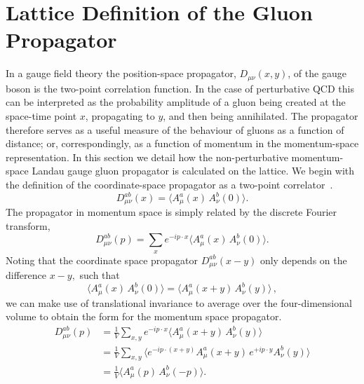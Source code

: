 \section{Lattice Definition of the Gluon Propagator}
In a gauge field theory the position-space propagator, $D_{\mu\nu}(x,y)$, of the gauge boson is the two-point correlation function. In the case of perturbative QCD this can be interpreted as the probability amplitude of a gluon being created at the space-time point $x$, propagating to $y$, and then being annihilated. The propagator therefore serves as a useful measure of the behaviour of gluons as a function of distance; or, correspondingly, as a function of momentum in the momentum-space representation. In this section we detail how the non-perturbative momentum-space Landau gauge gluon propagator is calculated on the lattice. We begin with the definition of the coordinate-space propagator as a two-point correlator~\cite{Zwanziger:1991gz,Cucchieri:1999sz,Langfeld:2001cz}.
\begin{equation}
D^{ab}_{\mu\nu}(x) = \langle A^a_\mu(x) \, A^b_\nu(0)\rangle.
\label{eq:coordGluonProp}
\end{equation}
The propagator in momentum space is simply related by the discrete Fourier transform,
\begin{equation}
D^{ab}_{\mu\nu}(p) = \sum_x e^{-ip\cdot x} \langle A^a_\mu(x) \, A^b_\nu(0) \rangle. 
\end{equation}
Noting that the coordinate space propagator $D^{ab}_{\mu\nu}(x-y)$ only depends on the difference $x-y,$ such that
\begin{equation}
\langle A^a_\mu(x) \, A^b_\nu(0)\rangle = \langle A^a_\mu(x+y) \, A^b_\nu(y)\rangle\, ,
\end{equation}
we can make use of translational invariance to average over the four-dimensional volume to obtain the form for the momentum space propagator.
\begin{align}
D^{ab}_{\mu\nu}(p) &= \frac{1}{V}\sum_{x,y} e^{-ip\cdot x}\langle A^a_\mu(x+y) \, A^b_\nu(y) \rangle \nonumber \\
                &= \frac{1}{V}\sum_{x,y} \langle e^{-ip\cdot (x+y)} A^a_\mu(x+y) \, e^{+ip\cdot y}A^b_\nu(y) \rangle \nonumber \\
                &= \frac{1}{V}\langle A^a_\mu(p) \, A^b_\nu(-p) \rangle. \label{eq:gluPropxtop}
\end{align}

